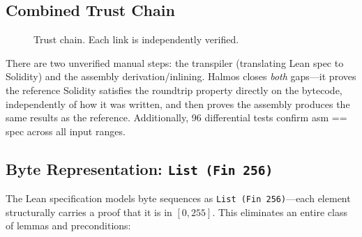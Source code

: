 \documentclass[11pt,a4paper]{article}
\begin{document}
\subsection{Combined Trust Chain}

\begin{figure}[h]
\centering
{}
\caption{Trust chain. Each link is independently verified.}
\label{fig:trust}
\end{figure}

There are two unverified manual steps: the transpiler (translating Lean spec to
Solidity) and the assembly derivation/inlining. Halmos closes \emph{both}
gaps---it proves the reference Solidity satisfies the roundtrip property directly
on the bytecode, independently of how it was written, and then proves the assembly
produces the same results as the reference. Additionally, 96 differential tests
confirm asm == spec across all input ranges.

\subsection{Byte Representation: \texttt{List (Fin 256)}}

The Lean specification models byte sequences as \texttt{List (Fin 256)}---each
element structurally carries a proof that it is in $[0, 255]$.  This eliminates
an entire class of lemmas and preconditions:
\end{document}
